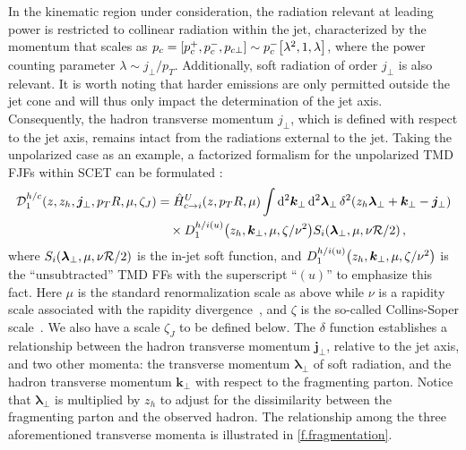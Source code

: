 \documentclass[a4paper, 11 pt]{article}
\begin{document}
In the kinematic region under consideration, the radiation relevant at leading power is restricted to collinear radiation within the jet, characterized by the momentum that scales as $p_c = \bqty{p_c^+, p_c^-, p_{c\perp}} \sim p_c^- \bqty{\lambda ^2, 1, \lambda}$, where the power counting parameter $\lambda \sim j_{\perp} / p_T$.
Additionally, soft radiation of order $j_{\perp}$ is also relevant.
It is worth noting that harder emissions are only permitted outside the jet cone and will thus only impact the determination of the jet axis.
Consequently, the hadron transverse momentum $j_{\perp}$, which is defined with respect to the jet axis, remains intact from the radiations external to the jet.
Taking the unpolarized case as an example, a factorized formalism for the unpolarized TMD FJFs within SCET can be formulated \cite{Kang:2017glf}:
\begin{align}
\mathcal{D}_1^{h/c} \pqty{z, z_h, \boldsymbol{j}_{\perp}, p_TR, \mu, \zeta_J}
& =
\hat{H}^U_{c \to i} \pqty{z, p_T R, \mu}
\int \dd[2]{\boldsymbol{k}_{\perp}} \dd[2]{\boldsymbol{\lambda}_{\perp}} \delta ^2 \pqty{z_h \boldsymbol{\lambda}_{\perp} + \boldsymbol{k}_{\perp} - \boldsymbol{j}_{\perp}}
\nonumber \\
& \quad \times
D_1^{h/i(u)} \pqty{z_h, \boldsymbol{k}_{\perp}, \mu, \zeta/\nu^2} S_i \pqty{\boldsymbol{\lambda}_{\perp}, \mu, \nu \mathcal{R}/2}
\, ,
\end{align}
where $S_i \pqty{\boldsymbol{\lambda}_{\perp}, \mu, \nu \mathcal{R}/2}$ is the in-jet soft function, and $D_1^{h/i(u)} \pqty{z_h, \boldsymbol{k}_{\perp}, \mu, \zeta/\nu^2}$ is the ``unsubtracted'' TMD FFs with the superscript ``$(u)$'' to emphasize this fact. Here $\mu$ is the standard renormalization scale as above while $\nu$ is a rapidity scale associated with the rapidity divergence~\cite{Chiu:2011qc, Chiu:2012ir}, and $\zeta$ is the so-called Collins-Soper scale~\cite{Collins:2011zzd}. We also have a scale $\zeta_J$ to be defined below.
The $\delta$ function establishes a relationship between the hadron transverse momentum $\boldsymbol{j}_{\perp}$, relative to the jet axis, and two other momenta: the transverse momentum $\boldsymbol{\lambda}_{\perp}$ of soft radiation, and the hadron transverse momentum $\boldsymbol{k}_{\perp}$ with respect to the fragmenting parton.
Notice that $\boldsymbol{\lambda}_{\perp}$ is multiplied by $z_h$ to adjust for the dissimilarity between the fragmenting parton and the observed hadron.
The relationship among the three aforementioned transverse momenta is illustrated in \cref{f.fragmentation}.
\end{document}
